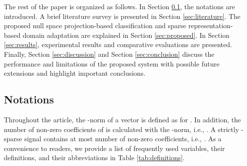 \documentclass[journal,transmag]{IEEEtran}
\begin{document}
The rest of the paper is organized as follows. In Section \ref{sec:notations}, the notations are introduced. A brief literature survey is presented in Section \ref{sec:literature}. The proposed null space projection-based classification and sparse representation-based domain adaptation are explained in Section \ref{sec:proposed}. In Section \ref{sec:results}, experimental results and comparative evaluations are presented. Finally, Section \ref{sec:discussion} and Section \ref{sec:conclusion} discuss the performance and limitations of the proposed system with possible future extensions and highlight important conclusions.
 











\subsection{Notations}
\label{sec:notations}
Throughout the article, the -norm of a vector  is defined as  for . In addition, the number of non-zero coefficients of  is calculated with the -norm, i.e., . A strictly -sparse signal contains at most  number of non-zero coefficients, i.e., . As a convenience to readers, we provide a list of frequently used variables, their definitions, and their abbreviations in Table \ref{tab:definitions}.
\end{document}
